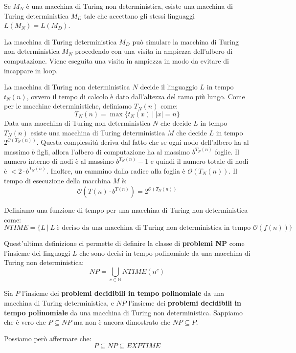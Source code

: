 \begin{teorema}
    Se $M_N$ è una macchina di Turing non deterministica, esiste una macchina di
    Turing deterministica $M_D$ tale che accettano gli stessi linguaggi $L(M_N)
        = L(M_D)$.
\end{teorema}
\begin{dimostrazione}
    La macchina di Turing deterministica $M_D$ può simulare la macchina di Turing
    non deterministica $M_N$ procedendo con una visita in ampiezza dell'albero
    di computazione. Viene eseguita una visita in ampiezza in modo da evitare di
    incappare in loop.
\end{dimostrazione}
La macchina di Turing non deterministica $N$ decide il linguaggio $L$ in tempo
$t_N(n)$, ovvero il tempo di calcolo è dato dall'altezza del ramo più lungo.
Come per le macchine deterministiche, definiamo $T_N(n)$ come:
\begin{equation}
    T_N(n) = \max \{t_N(x) \ | \ |x| = n\}
\end{equation}
Data una macchina di Turing non deterministica $N$ che decide $L$ in tempo
$T_N(n)$ esiste una macchina di Turing deterministica $M$ che decide $L$ in tempo
$2^{\mathcal{O}(T_N(n))}$. Questa complessità deriva dal fatto che se ogni nodo
dell'albero ha al massimo $b$ figli, allora l'albero di computazione ha al
massimo $b^{T_N(n)}$ foglie. Il numero interno di nodi è al massimo $b^{T_N(n)}
    - 1$ e quindi il numero totale di nodi è $< 2 \cdot b^{T_N(n)}$. Inoltre, un
cammino dalla radice alla foglia è $\mathcal{O}(T_N(n))$. Il tempo di esecuzione
della macchina $M$ è:
\begin{equation}
    \mathcal{O}(T(n) \cdot b^{T(n)}) = 2^{\mathcal{O}(T_N(n))}
\end{equation}
\begin{definizione}
    Definiamo una funzione di tempo per una macchina di Turing non deterministica
    come:
    \begin{equation}
        NTIME = \{L \ | \ L \ \text{è deciso da una macchina di Turing non
            deterministica in tempo } \mathcal{O}(f(n))\}
    \end{equation}
\end{definizione}
Quest'ultima definizione ci permette di definire la classe di \textbf{problemi NP}
come l'insieme dei linguaggi $L$ che sono decisi in tempo polinomiale da una
macchina di Turing non deterministica:
\begin{equation}
    NP = \bigcup_{c \in \mathbb{N}} NTIME(n^c)
\end{equation}
\begin{osservazione}
    Sia $P$ l'insieme dei \textbf{problemi decidibili in tempo polinomiale} da
    una macchina di Turing deterministica, e $NP$ l'insieme dei \textbf{problemi
        decidibili in tempo polinomiale} da una macchina di Turing non
    deterministica. Sappiamo che è vero che $P \subseteq NP$ ma non è ancora
    dimostrato che $NP \subseteq P$.
\end{osservazione}
Possiamo però affermare che:
\begin{equation}
    P \subseteq NP \subseteq EXPTIME
\end{equation}
